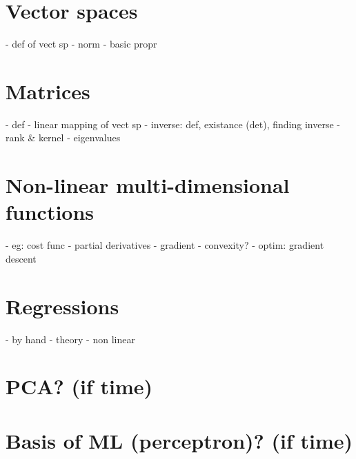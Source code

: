 \documentclass[11pt,a4paper]{article}
\begin{document}
\section{Vector spaces}
- def of vect sp
- norm
- basic propr
\section{Matrices}
- def
- linear mapping of vect sp
- inverse: def, existance (det), finding inverse
- rank \& kernel
- eigenvalues

\section{Non-linear multi-dimensional functions}
- eg: cost func
- partial derivatives
- gradient
- convexity?
- optim: gradient descent
\section{Regressions}
- by hand
- theory
- non linear

\section{PCA? (if time)}
\section{Basis of ML (perceptron)? (if time)}
\end{document}
